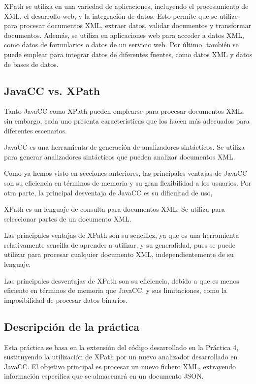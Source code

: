 XPath se utiliza en una variedad de aplicaciones, incluyendo el procesamiento de XML, el desarrollo web, y la integración de datos. Esto permite que se utilize para procesar documentos XML, extraer datos, validar documentos y transformar documentos. Además, se utiliza en aplicaciones web para acceder a datos XML, como datos de formularios o datos de un servicio web. Por último, también se puede emplear para integrar datos de diferentes fuentes, como datos XML y datos de bases de datos.

\subsection{JavaCC vs. XPath}

\noindent Tanto JavaCC como XPath pueden emplearse para procesar documentos XML, sin embargo, cada uno presenta características que los hacen más adecuados para diferentes escenarios.

JavaCC es una herramienta de generación de analizadores sintácticos. Se utiliza para generar analizadores sintácticos que pueden analizar documentos XML.

Como ya hemos visto en secciones anteriores, las principales ventajas de JavaCC son su eficiencia en términos de memoria y su gran flexibilidad a los usuarios. Por otra parte, la principal desventaja de JavaCC es su dificultad de uso,

XPath es un lenguaje de consulta para documentos XML. Se utiliza para seleccionar partes de un documento XML.

Las principales ventajas de XPath son su sencillez, ya que es una herramienta relativamente sencilla de aprender a utilizar, y su generalidad, pues se puede utilizar para procesar cualquier documento XML, independientemente de su lenguaje.

Las principales desventajas de XPath son su eficiencia, debido a que es menos eficiente en términos de memoria que JavaCC, y sus limitaciones, como la imposibilidad de procesar datos binarios.


\subsection{Descripción de la práctica}

\noindent Esta práctica se basa en la extensión del código desarrollado en la Práctica 4, sustituyendo la utilización de XPath por un nuevo analizador desarrollado en JavaCC. El objetivo principal es procesar un nuevo fichero XML, extrayendo información específica que se almacenará en un documento JSON.

